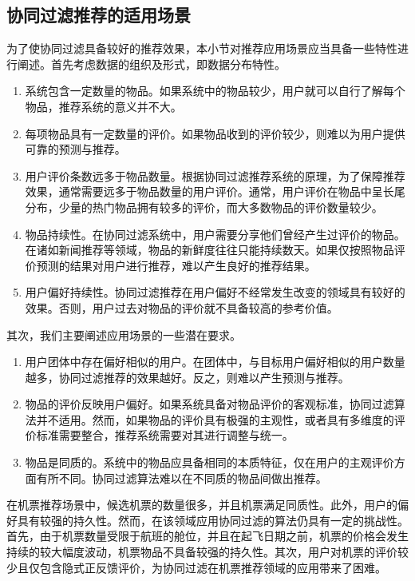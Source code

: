 \subsection{协同过滤推荐的适用场景}

为了使协同过滤具备较好的推荐效果，本小节对推荐应用场景应当具备一些特性进行阐述。首先考虑数据的组织及形式，即数据分布特性。

\begin{enumerate}
  \item 系统包含一定数量的物品。如果系统中的物品较少，用户就可以自行了解每个物品，推荐系统的意义并不大。
  \item 每项物品具有一定数量的评价。如果物品收到的评价较少，则难以为用户提供可靠的预测与推荐。
  \item 用户评价条数远多于物品数量。根据协同过滤推荐系统的原理，为了保障推荐效果，通常需要远多于物品数量的用户评价。通常，用户评价在物品中呈长尾分布，少量的热门物品拥有较多的评价，而大多数物品的评价数量较少。
  \item 物品持续性。在协同过滤系统中，用户需要分享他们曾经产生过评价的物品。在诸如新闻推荐等领域，物品的新鲜度往往只能持续数天。如果仅按照物品评价预测的结果对用户进行推荐，难以产生良好的推荐结果。
  \item 用户偏好持续性。协同过滤推荐在用户偏好不经常发生改变的领域具有较好的效果。否则，用户过去对物品的评价就不具备较高的参考价值。
\end{enumerate}

其次，我们主要阐述应用场景的一些潜在要求。

\begin{enumerate}
	\item 用户团体中存在偏好相似的用户。在团体中，与目标用户偏好相似的用户数量越多，协同过滤推荐的效果越好。反之，则难以产生预测与推荐。
	\item 物品的评价反映用户偏好。如果系统具备对物品评价的客观标准，协同过滤算法并不适用。然而，如果物品的评价具有极强的主观性，或者具有多维度的评价标准需要整合，推荐系统需要对其进行调整与统一。
	\item 物品是同质的。系统中的物品应具备相同的本质特征，仅在用户的主观评价方面有所不同。协同过滤算法难以在不同质的物品间做出推荐。
\end{enumerate}

在机票推荐场景中，候选机票的数量很多，并且机票满足同质性。此外，用户的偏好具有较强的持久性。然而，在该领域应用协同过滤的算法仍具有一定的挑战性。首先，由于机票数量受限于航班的舱位，并且在起飞日期之前，机票的价格会发生持续的较大幅度波动，机票物品不具备较强的持久性。其次，用户对机票的评价较少且仅包含隐式正反馈评价，为协同过滤在机票推荐领域的应用带来了困难。




















